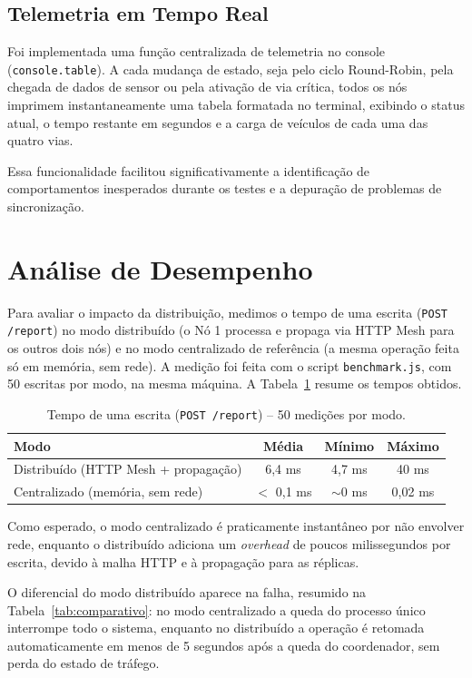 \documentclass[12pt]{article}
\begin{document}
\subsection{Telemetria em Tempo Real}

Foi implementada uma função centralizada de telemetria no console (\texttt{console.table}). A cada mudança de estado, seja pelo ciclo Round-Robin, pela chegada de dados de sensor ou pela ativação de via crítica, todos os nós imprimem instantaneamente uma tabela formatada no terminal, exibindo o status atual, o tempo restante em segundos e a carga de veículos de cada uma das quatro vias.

Essa funcionalidade facilitou significativamente a identificação de comportamentos inesperados durante os testes e a depuração de problemas de sincronização.

\section{Análise de Desempenho}

Para avaliar o impacto da distribuição, medimos o tempo de uma escrita (\texttt{POST /report}) no modo distribuído (o Nó 1 processa e propaga via HTTP Mesh para os outros dois nós) e no modo centralizado de referência (a mesma operação feita só em memória, sem rede). A medição foi feita com o script \texttt{benchmark.js}, com 50 escritas por modo, na mesma máquina. A Tabela~\ref{tab:latencia} resume os tempos obtidos.

\begin{table}[ht]
\centering
\caption{Tempo de uma escrita (\texttt{POST /report}) -- 50 medições por modo.}
\label{tab:latencia}
\begin{tabular}{lccc}
\hline
\textbf{Modo} & \textbf{Média} & \textbf{Mínimo} & \textbf{Máximo} \\
\hline
Distribuído (HTTP Mesh + propagação) & 6,4 ms & 4,7 ms & 40 ms \\
Centralizado (memória, sem rede) & $<$ 0,1 ms & $\sim$0 ms & 0,02 ms \\
\hline
\end{tabular}
\end{table}

Como esperado, o modo centralizado é praticamente instantâneo por não envolver rede, enquanto o distribuído adiciona um \textit{overhead} de poucos milissegundos por escrita, devido à malha HTTP e à propagação para as réplicas.

O diferencial do modo distribuído aparece na falha, resumido na Tabela~\ref{tab:comparativo}: no modo centralizado a queda do processo único interrompe todo o sistema, enquanto no distribuído a operação é retomada automaticamente em menos de 5 segundos após a queda do coordenador, sem perda do estado de tráfego.
\end{document}
